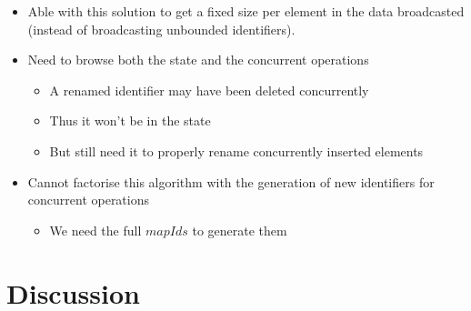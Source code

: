 \documentclass[a4paper]{article}
\begin{document}
\begin{itemize}
  \item Able with this solution to get a fixed size per element in the data broadcasted
    (instead of broadcasting unbounded identifiers).
  \item Need to browse both the state and the concurrent operations
  \begin{itemize}
    \item A renamed identifier may have been deleted concurrently
    \item Thus it won't be in the state
    \item But still need it to properly rename concurrently inserted elements
  \end{itemize}
  \item Cannot factorise this algorithm with the generation of new identifiers
    for concurrent operations
  \begin{itemize}
    \item We need the full $mapIds$ to generate them
  \end{itemize}
\end{itemize}

\section{Discussion}
\end{document}
